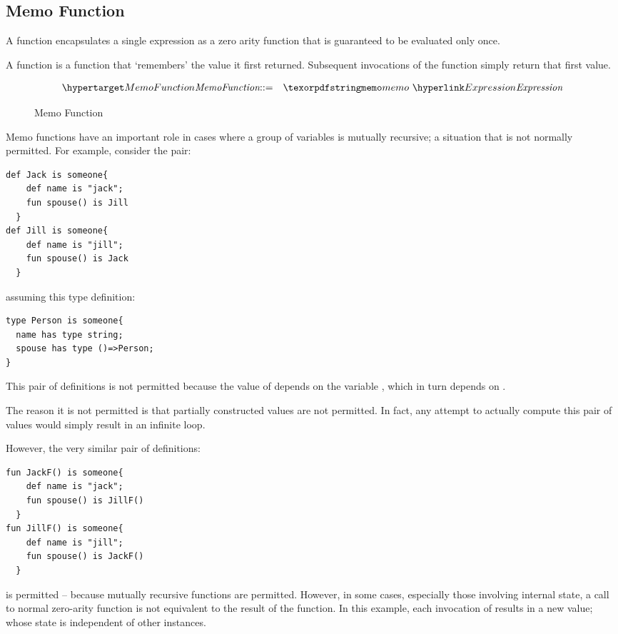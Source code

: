 \subsection{Memo Function}
\label{memoFunction}

A  function encapsulates a single expression as a zero arity function that is guaranteed to be evaluated only once. 

A  function is a function that `remembers' the value it first returned. Subsequent invocations of the function simply return that first value.

\begin{figure}[htbp]
\begin{eqnarray*}
\ntDef{MemoFunction}&\arrow&\q{memo}\ \ntRef{Expression}
\end{eqnarray*}
\caption{Memo Function}
\label{memoFunctionFig}
\end{figure}

Memo functions have an important role in cases where a group of variables is mutually recursive; a situation that is not normally permitted. For example, consider the pair:
\begin{lstlisting}
def Jack is someone{
    def name is "jack";
    fun spouse() is Jill
  }
def Jill is someone{
    def name is "jill";
    fun spouse() is Jack
  }
\end{lstlisting}
assuming this type definition:
\begin{lstlisting}
type Person is someone{
  name has type string;
  spouse has type ()=>Person;
}
\end{lstlisting}

This pair of definitions is not permitted because the value of  depends on the variable , which in turn depends on .
\begin{aside}
The reason it is not permitted is that partially constructed values are not permitted. In fact, any attempt to actually compute this pair of values would simply result in an infinite loop.
\end{aside}

However, the very similar pair of definitions:
\begin{lstlisting}
fun JackF() is someone{
    def name is "jack";
    fun spouse() is JillF()
  }
fun JillF() is someone{
    def name is "jill";
    fun spouse() is JackF()
  }
\end{lstlisting}
is permitted -- because mutually recursive functions are permitted. However, in some cases, especially those involving internal state, a call to normal zero-arity function is not equivalent to the result of the function. In this example, each invocation of  results in a new value; whose state is independent of other instances.

